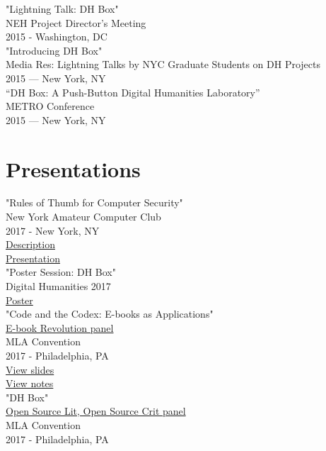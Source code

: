 \documentclass[11pt]{article}
\begin{document}
"Lightning Talk: DH Box"\\
NEH Project Director's Meeting\\
2015 - Washington, DC\\

"Introducing DH Box"\\
Media Res: Lightning Talks by NYC Graduate Students on DH Projects\\
2015 — New York, NY\\

“DH Box: A Push-Button Digital Humanities Laboratory”\\
METRO Conference\\
2015 — New York, NY\\

\section*{Presentations}
\label{sec:orgheadline7}
"Rules of Thumb for Computer Security"\\
New York Amateur Computer Club\\
2017 - New York, NY\\
\href{http://nyacc.org/}{Description}\\
\href{http://htmlpreview.github.io/?https://github.com/smythp/security-workshop/blob/master/presentation/index.html#/sec-title-slide}{Presentation}\\

"Poster Session: DH Box"\\
Digital Humanities 2017\\
\href{./resources/dh_box_poster.jpg}{Poster}\\

"Code and the Codex: E-books as Applications"\\
\href{https://apps.mla.org/program_details?prog_id=75&year=2017}{E-book Revolution panel}\\
MLA Convention\\
2017 - Philadelphia, PA\\
\href{http://htmlpreview.github.io/?https://github.com/smythp/ebooks-as-applications/blob/master/presentation.html#/sec-title-slide}{View slides}\\
\href{https://github.com/smythp/ebooks-as-applications#ebooks-as-applications}{View notes}\\

"DH Box"\\
\href{https://text.mla.hcommons.org/}{Open Source Lit, Open Source Crit panel}\\
MLA Convention\\
2017 - Philadelphia, PA\\
\end{document}
